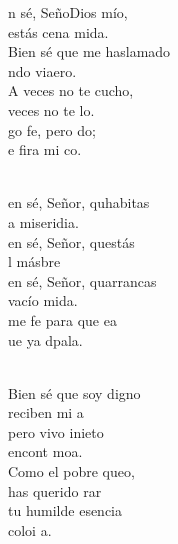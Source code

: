 \documentclass[12pt]{article}
\begin{document}
\begin{multicols*}{2}
        \begin{cancion}%
            n sé, SeñoDios mío, \\
             estás cena mida.\\
            Bien sé que me haslamado \\
            ndo viaero.\\
        \jump
            A veces no te cucho, \\
            veces no te lo.\\
            go fe, pero do; \\
            e fira mi co.  \\\jump\\
            \begin{chorus}%
            en sé, Señor, quhabitas \\
            a miseridia. \\
            en sé, Señor, questás\\
            l másbre\\
            en sé, Señor, quarrancas\\
            vacío mida. \\
            me fe para que ea\\
            ue ya  dpala.\\
            \end{chorus}%
            \jump\\
            Bien sé que soy digno \\
            reciben mi a\\
            pero vivo inieto\\
             encont  moa.\\
        \jump
            Como el pobre queo, \\
             has querido rar\\
             tu humilde esencia \\
             coloi a. \\
        \end{cancion}%
        

\end{multicols*}
\end{document}
